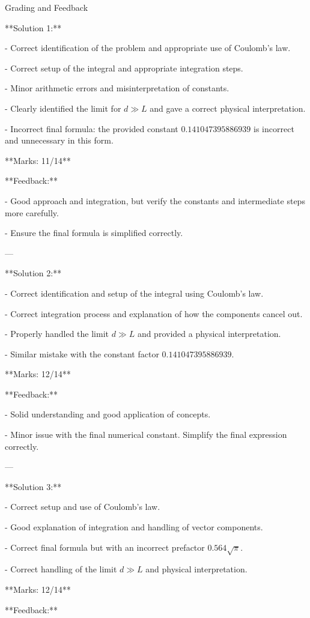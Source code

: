 \documentclass[a4paper,11pt]{article}
\begin{document}
Grading and Feedback

**Solution 1:**

- Correct identification of the problem and appropriate use of Coulomb’s law.

- Correct setup of the integral and appropriate integration steps.

- Minor arithmetic errors and misinterpretation of constants.

- Clearly identified the limit for \(d \gg L\) and gave a correct physical interpretation.

- Incorrect final formula: the provided constant \(0.141047395886939\) is incorrect and unnecessary in this form.

**Marks: 11/14**

**Feedback:**

- Good approach and integration, but verify the constants and intermediate steps more carefully.

- Ensure the final formula is simplified correctly.

---

**Solution 2:**

- Correct identification and setup of the integral using Coulomb’s law.

- Correct integration process and explanation of how the components cancel out.

- Properly handled the limit \(d \gg L\) and provided a physical interpretation.

- Similar mistake with the constant factor \(0.141047395886939\).

**Marks: 12/14**

**Feedback:**

- Solid understanding and good application of concepts.

- Minor issue with the final numerical constant. Simplify the final expression correctly.

---

**Solution 3:**

- Correct setup and use of Coulomb’s law.

- Good explanation of integration and handling of vector components.

- Correct final formula but with an incorrect prefactor \(0.564 \sqrt{\pi}\).

- Correct handling of the limit \(d \gg L\) and physical interpretation.

**Marks: 12/14**

**Feedback:**
\end{document}

